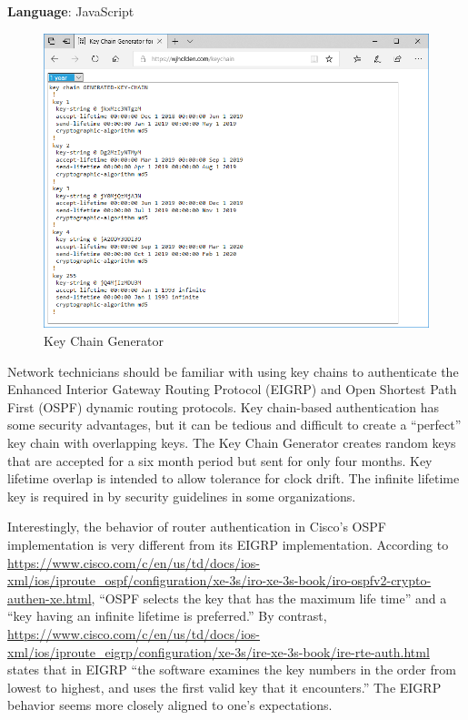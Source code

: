\documentclass[12pt]{article}
\begin{document}
\textbf{Language}: JavaScript

\begin{figure}[h]
\centering
\includegraphics[width=\textwidth]{Key-Chain.PNG}
\caption{Key Chain Generator}
\label{fig:keychain}
\end{figure}

Network technicians should be familiar with using key chains to authenticate the Enhanced Interior Gateway Routing Protocol (EIGRP) and Open Shortest Path First (OSPF) dynamic routing protocols. Key chain-based authentication has some security advantages, but it can be tedious and difficult to create a ``perfect'' key chain with overlapping keys. The Key Chain Generator creates random keys that are accepted for a six month period but sent for only four months. Key lifetime overlap is intended to allow tolerance for clock drift. The infinite lifetime key is required in by security guidelines in some organizations.

Interestingly, the behavior of router authentication in Cisco's OSPF implementation is very different from its EIGRP implementation. According to \url{https://www.cisco.com/c/en/us/td/docs/ios-xml/ios/iproute_ospf/configuration/xe-3s/iro-xe-3s-book/iro-ospfv2-crypto-authen-xe.html}, ``OSPF selects the key that has the maximum life time'' and a ``key having an infinite lifetime is preferred.'' By contrast, \url{https://www.cisco.com/c/en/us/td/docs/ios-xml/ios/iproute_eigrp/configuration/xe-3s/ire-xe-3s-book/ire-rte-auth.html} states that in EIGRP ``the software examines the key numbers in the order from lowest to highest, and uses the first valid key that it encounters.'' The EIGRP behavior seems more closely aligned to one's expectations.
\end{document}
